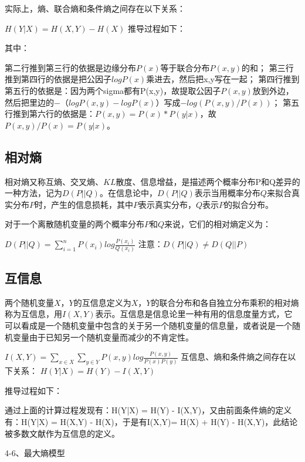 \documentclass[11pt]{book}
\newcounter{#2}
\newcounter{#2}[#1]
\numberwithin{#2}{#1}
\begin{document}
实际上，熵、联合熵和条件熵之间存在以下关系：

$ H\left( Y|X \right) =H\left( X,Y\right) -H\left( X \right)  $
推导过程如下：

其中：

第二行推到第三行的依据是边缘分布$ P(x) $等于联合分布$ P(x,y) $的和；
第三行推到第四行的依据是把公因子$ logP(x) $乘进去，然后把x,y写在一起；
第四行推到第五行的依据是：因为两个sigma都有P(x,y)，故提取公因子$ P(x,y) $放到外边，然后把里边的$ -（log P(x,y) - log P(x)） $写成$ - log (P(x,y) / P(x) )  $；
第五行推到第六行的依据是：$ P(x,y) = P(x) * P(y|x) $，故$ P(x,y) / P(x) = P(y|x) $。
\subsection{相对熵}

相对熵又称互熵、交叉熵、$ KL $散度、信息增益，是描述两个概率分布P和Q差异的一种方法，记为$ D(P||Q) $。在信息论中，$ D(P||Q) $表示当用概率分布$ Q $来拟合真实分布$ P $时，产生的信息损耗，其中$ P $表示真实分布，$ Q $表示$ P $的拟合分布。

对于一个离散随机变量的两个概率分布$ P $和$ Q $来说，它们的相对熵定义为：

$ D\left( P||Q \right) =\sum_{i=1}^{n}{P\left( x_{i}  \right) log\frac{P\left( x_{i}  \right) }{Q\left( x_{i}  \right) } } $ 
注意：$ D(P||Q) ≠ D(Q||P) $

\subsection{互信息}

两个随机变量$ X $，$ Y $的互信息定义为$ X $，$ Y $的联合分布和各自独立分布乘积的相对熵称为互信息，用$ I(X,Y) $表示。互信息是信息论里一种有用的信息度量方式，它可以看成是一个随机变量中包含的关于另一个随机变量的信息量，或者说是一个随机变量由于已知另一个随机变量而减少的不肯定性。

$ I\left( X,Y \right) =\sum_{x\in X}^{}{\sum_{y\in Y}^{}{P\left( x,y \right) } log\frac{P\left( x,y \right) }{P\left( x \right) P\left( y \right) } }  $
互信息、熵和条件熵之间存在以下关系： $ H\left( Y|X \right) =H\left( Y \right) -I\left( X,Y \right)  $

推导过程如下：

通过上面的计算过程发现有：H(Y|X) = H(Y) - I(X,Y)，又由前面条件熵的定义有：H(Y|X) = H(X,Y) - H(X)，于是有I(X,Y)= H(X) + H(Y) - H(X,Y)，此结论被多数文献作为互信息的定义。

4-6、最大熵模型
\end{document}
